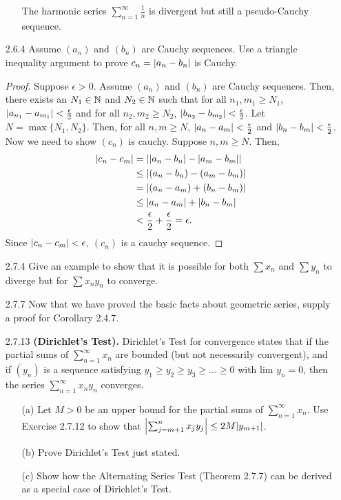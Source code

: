 \documentclass[12pt,letterpaper]{article}
\begin{document}
\begin{itemize}[leftmargin=!,labelindent=5pt]
\begin{itemize}
                The harmonic series $\sum_{n=1}^{\infty} \frac{1}{n}$ is divergent but still a pseudo-Cauchy sequence.
        \end{itemize}
    \item [2.6.4] Assume $(a_n)$ and $(b_n)$ are Cauchy sequences. Use a triangle inequality argument to prove $c_n = \abs{a_n - b_n}$ is Cauchy.
        \begin{proof}
            Suppose $\epsilon > 0$.
            Assume $(a_n)$ and $(b_n)$ are Cauchy sequences.
            Then, there exists an $N_1 \in \mathbb{N}$ and $N_2 \in \mathbb{N}$ such that for all $n_1, m_1 \geq N_1$, $\abs{a_{n_1} - a_{m_1}} < \frac{\epsilon}{2}$ and for all $n_2, m_2 \geq N_2$, $\abs{b_{n_2} - b_{m_2}} < \frac{\epsilon}{2}$.
            Let $N = \max \{N_1, N_2\}$.
            Then, for all $n, m \geq N$, $\abs{a_n - a_m} < \frac{\epsilon}{2}$ and $\abs{b_n - b_m} < \frac{\epsilon}{2}$.
            Now we need to show $(c_n)$ is cauchy. Suppose $n, m \geq N$. Then,
            \begin{align*}
                \abs{c_n - c_m} &= \abs{\abs{a_n - b_n} - \abs{a_m - b_m}}\\
                &\leq \abs{(a_n - b_n) - (a_m - b_m)}\\
                &= \abs{(a_n - a_m) + (b_n - b_m)}\\
                &\leq \abs{a_n - a_m} + \abs{b_n - b_m}\\
                &< \frac{\epsilon}{2} + \frac{\epsilon}{2} = \epsilon.
            \end{align*}
            Since $\abs{c_n - c_m} < \epsilon$, $(c_n)$ is a cauchy sequence.
        \end{proof}
    \newpage
    \item [2.7.4] Give an example to show that it is possible for both $\sum{x_n}$ and $\sum{y_n}$ to diverge but for $\sum{x_n y_n}$ to converge.
    \item [2.7.7] Now that we have proved the basic facts about geometric series, supply a proof for Corollary 2.4.7.
    \item [2.7.13] \textbf{(Dirichlet’s Test).} Dirichlet’s Test for convergence states that if the partial sums of $\sum_{n=1}^{\infty} x_n$ are bounded (but not necessarily convergent), and if $(y_n)$ is a sequence satisfying $y_1 \geq y_2 \geq y_3 \geq ... \geq 0$ with lim $y_n = 0$, then the series $\sum_{n=1}^{\infty} x_n y_n$ converges.
        \begin{itemize}
            \item [(a)] Let $M > 0$ be an upper bound for the partial sums of $\sum_{n=1}^{\infty}x_n$. Use Exercise 2.7.12 to show that $\abs{\sum_{j=m+1}^{n} x_j y_j} \leq 2M \abs{y_{m+1}}$.
            \item [(b)] Prove Dirichlet’s Test just stated.
            \item [(c)] Show how the Alternating Series Test (Theorem 2.7.7) can be derived as a special case of Dirichlet’s Test.
        \end{itemize}
\end{itemize}
\end{document}
